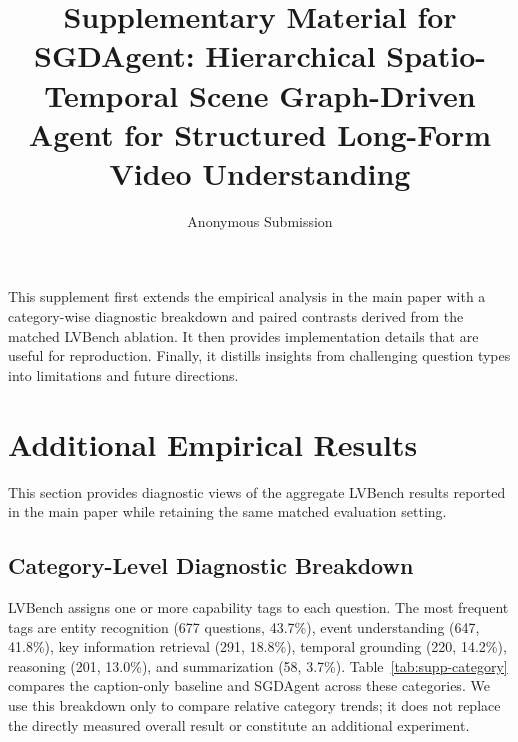 \documentclass[11pt]{article}
\title{Supplementary Material for SGDAgent: Hierarchical Spatio-Temporal Scene Graph-Driven Agent for Structured Long-Form Video Understanding}
\author{Anonymous Submission}
\begin{document}
\maketitle

\noindent
This supplement first extends the empirical analysis in the main paper with a category-wise diagnostic breakdown and paired contrasts derived from the matched LVBench ablation.
It then provides implementation details that are useful for reproduction.
Finally, it distills insights from challenging question types into limitations and future directions.


\section{Additional Empirical Results}
\label{sec:supp-analysis}

This section provides diagnostic views of the aggregate LVBench results reported in the main paper while retaining the same matched evaluation setting.

\subsection{Category-Level Diagnostic Breakdown}

LVBench assigns one or more capability tags to each question.
The most frequent tags are entity recognition (677 questions, 43.7\%), event understanding (647, 41.8\%), key information retrieval (291, 18.8\%), temporal grounding (220, 14.2\%), reasoning (201, 13.0\%), and summarization (58, 3.7\%).
Table~\ref{tab:supp-category} compares the caption-only baseline and SGDAgent across these categories.
We use this breakdown only to compare relative category trends; it does not replace the directly measured overall result or constitute an additional experiment.
\end{document}
